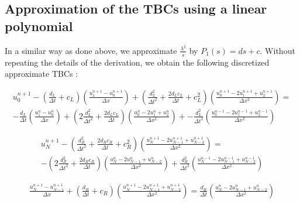 \subsection{Approximation of the TBCs using a linear polynomial}

\indent In a similar way as done above, we approximate  $\frac{\lambda^2}{s}$ by $P_1(s) = ds + c$. Without repeating the details of the derivation, we obtain the following discretized approximate TBCs : 

\begin{equation}
\label{eq:appDiscTBCP0}
	\begin{aligned}
    u_0^{n+1} - \left( \frac{d_L}{\Delta t} + c_L \right) \left( \frac{u_1^{n+1} - u_0^{n+1}}{\Delta x}\right) +   \left( \frac{d_L^2}{\Delta t^2} + \frac{2d_Lc_L}{\Delta t} + c_L^2  \right) \left(  \frac{u_0^{n+1} - 2u_1^{n+1} + u_2^{n+1}}{\Delta x^2} \right)  = \\
        -\frac{d_L}{\Delta t}\left( \frac{u_1^{n} - u_0^{n}}{\Delta x}\right) +  \left( 2\frac{d_L^2}{\Delta t^2} + \frac{2d_Lc_L}{\Delta t}\right) \left(  \frac{u_0^{n} - 2u_1^n + u_2^{n}}{\Delta x^2} \right) +   -  \frac{d_L^2}{\Delta t^2} \left(  \frac{u_0^{n-1} - 2u_1^{n-1} + u_2^{n-1}}{\Delta x^2} \right)
   \end{aligned}
\end{equation} 

\begin{equation}
	\begin{aligned}
    u_N^{n+1} - \left( \frac{d_R^2}{\Delta t^2} + \frac{2d_Rc_R}{\Delta t} + c_R^2  \right) \left(  \frac{u_{N}^{n+1} - 2u_{N-1}^{n+1} + u_{N-2}^{n+1}}{\Delta x^2} \right) = \\
     -\left( 2\frac{d_R^2}{\Delta t^2} + \frac{2d_Rc_R}{\Delta t}\right) \left(  \frac{u_N^{n} - 2u_{N-1}^n + u_{N-2}^{n}}{\Delta x^2} \right) + \frac{d_R^2}{\Delta t^2} \left(  \frac{u_N^{n-1} - 2u_{N-1}^{n-1} + u_{N-2}^{n-1}}{\Delta x^2} \right)
    \end{aligned}
\end{equation} 
   
\begin{equation}
	\begin{aligned}	
    \frac{u_N^{n+1} - u_{N-1}^{n+1}}{\Delta x} + \left( \frac{d_R}{\Delta t} + c_R \right) \left( \frac{u_N^{n+1} -2 u_{N-1}^{n+1} + u_{N-2}^{n+1}}{\Delta x^2}\right) =      \frac{d_R}{\Delta t}\left( \frac{u_{N}^{n} - 2u_{N-1}^{n} + u_{N-2}^n}{\Delta x^2}\right)
    \end{aligned}
\end{equation}

